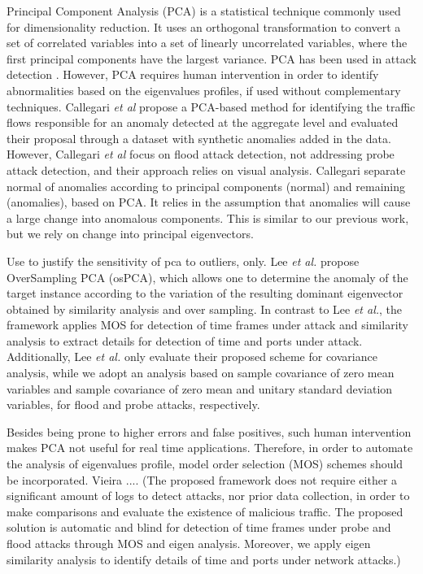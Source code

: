 \documentclass[review]{elsarticle}
\begin{document}
Principal Component Analysis (PCA) is a statistical technique commonly used for dimensionality reduction. It uses an orthogonal transformation to convert a set of correlated variables into a set of linearly uncorrelated variables, where the first principal components have the largest variance. PCA has been used in attack detection \cite{almotairi2009technique}. However, PCA requires human intervention in order to identify abnormalities based on the eigenvalues profiles, if used without complementary techniques. Callegari \emph{et al} \cite{callegari2011novel} propose a PCA-based method for identifying the traffic flows responsible for an anomaly detected at the aggregate level and evaluated their proposal through a dataset with synthetic anomalies added in the data. However, Callegari \emph{et al} focus on flood attack detection, not addressing probe attack detection, and their approach relies on visual analysis. Callegari separate normal of anomalies according to principal components (normal) and remaining (anomalies), based on PCA. It relies in the assumption that anomalies will cause a large change into anomalous components. This is similar to our previous work, but we rely on change into principal eigenvectors.

Use to justify the sensitivity of pca to outliers, only. Lee \emph{et al.} \cite{Lee2013} propose OverSampling PCA (osPCA), which allows one to determine the anomaly of the target instance according to the variation of the resulting dominant eigenvector obtained by similarity analysis and over sampling. In contrast to Lee \emph{et al.}, the framework applies MOS for detection of time frames under attack and similarity analysis to extract details for detection of time and ports under attack. Additionally, Lee \emph{et al.} only evaluate their proposed scheme for covariance analysis, while we adopt an analysis based on sample covariance of zero mean variables and sample covariance of zero mean and unitary standard deviation variables, for flood and probe attacks, respectively. 

Besides being prone to higher errors and false positives, such human intervention makes PCA not useful for real time applications. Therefore, in order to automate the analysis of eigenvalues profile, model order selection (MOS) schemes should be incorporated. Vieira .... (The proposed framework does not require either a significant amount of logs to detect attacks, nor prior data collection, in order to make comparisons and evaluate the existence of malicious traffic. The proposed solution is automatic and blind for detection of time frames under probe and flood attacks through MOS and eigen analysis. Moreover, we apply eigen similarity analysis to identify details of time and ports under network attacks.)
\end{document}
